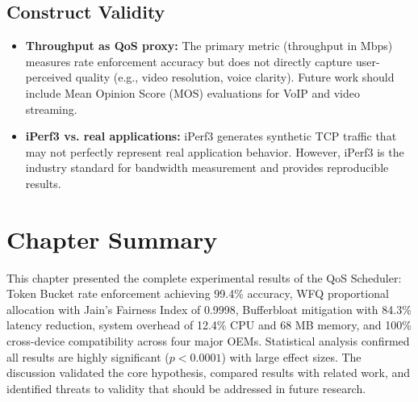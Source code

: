 \subsection{Construct Validity}

\begin{itemize}[noitemsep]
    \item \textbf{Throughput as QoS proxy:} The primary metric (throughput in Mbps) measures rate enforcement accuracy but does not directly capture user-perceived quality (e.g., video resolution, voice clarity). Future work should include Mean Opinion Score (MOS) evaluations for VoIP and video streaming.
    \item \textbf{iPerf3 vs. real applications:} iPerf3 generates synthetic TCP traffic that may not perfectly represent real application behavior. However, iPerf3 is the industry standard for bandwidth measurement and provides reproducible results.
\end{itemize}

\section{Chapter Summary}

This chapter presented the complete experimental results of the QoS Scheduler: Token Bucket rate enforcement achieving 99.4\% accuracy, WFQ proportional allocation with Jain's Fairness Index of 0.9998, Bufferbloat mitigation with 84.3\% latency reduction, system overhead of 12.4\% CPU and 68 MB memory, and 100\% cross-device compatibility across four major OEMs. Statistical analysis confirmed all results are highly significant ($p < 0.0001$) with large effect sizes. The discussion validated the core hypothesis, compared results with related work, and identified threats to validity that should be addressed in future research.
